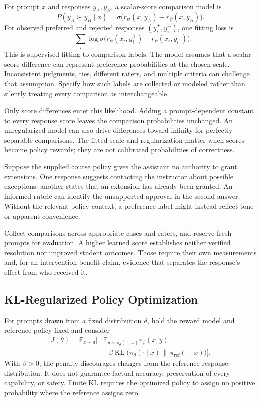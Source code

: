 For prompt $x$ and responses $y_A,y_B$, a scalar-score comparison model is
\[
P(y_A\succ y_B\mid x)
=\sigma\bigl(r_\psi(x,y_A)-r_\psi(x,y_B)\bigr).
\]
For observed preferred and rejected responses $(y_i^+,y_i^-)$, one fitting loss is
\[
-\sum_i\log\sigma\bigl(r_\psi(x_i,y_i^+)-r_\psi(x_i,y_i^-)\bigr).
\]
This is supervised fitting to comparison labels. The model assumes that a scalar score difference can represent preference probabilities at the chosen scale. Inconsistent judgments, ties, different raters, and multiple criteria can challenge that assumption. Specify how such labels are collected or modeled rather than silently treating every comparison as interchangeable.

Only score differences enter this likelihood. Adding a prompt-dependent constant to every response score leaves the comparison probabilities unchanged. An unregularized model can also drive differences toward infinity for perfectly separable comparisons. The fitted scale and regularization matter when scores become policy rewards; they are not calibrated probabilities of correctness.

\begin{example}
\label{ex:rlhf_assistant}
Suppose the supplied course policy gives the assistant no authority to grant extensions. One response suggests contacting the instructor about possible exceptions; another states that an extension has already been granted. An informed rubric can identify the unsupported approval in the second answer. Without the relevant policy context, a preference label might instead reflect tone or apparent convenience.

Collect comparisons across appropriate cases and raters, and reserve fresh prompts for evaluation. A higher learned score establishes neither verified resolution nor improved student outcomes. Those require their own measurements and, for an intervention-benefit claim, evidence that separates the response's effect from who received it.
\end{example}

\subsection{KL-Regularized Policy Optimization}

For prompts drawn from a fixed distribution $d$, hold the reward model and reference policy fixed and consider
\begin{align*}
J(\theta)=\mathbb E_{x\sim d}\bigl[
&\mathbb E_{y\sim\pi_\theta(\cdot\mid x)}r_\psi(x,y)\\
&-\beta\operatorname{KL}\bigl(\pi_\theta(\cdot\mid x)
\,\|\,\pi_{\mathrm{ref}}(\cdot\mid x)\bigr)\bigr].
\end{align*}
With $\beta>0$, the penalty discourages changes from the reference response distribution. It does not guarantee factual accuracy, preservation of every capability, or safety. Finite KL requires the optimized policy to assign no positive probability where the reference assigns zero.

